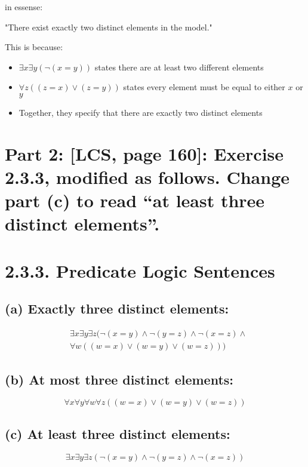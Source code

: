 \documentclass{article}
\begin{document}
\vspace{1em}
in essense:

\vspace{1em}
"There exist exactly two distinct elements in the model."

\vspace{1em}
This is because:
\begin{itemize}
    \item $\exists x \exists y (\neg(x = y))$ states there are at least two different elements
    \item $\forall z ((z = x) \lor (z = y))$ states every element must be equal to either $x$ or $y$
    \item Together, they specify that there are exactly two distinct elements
\end{itemize}

\newpage


\section*{Part 2: [LCS, page 160]: Exercise 2.3.3, modified as follows. Change part (c) to read “at least three
distinct elements”.}
\section*{2.3.3. Predicate Logic Sentences}

\subsection*{(a) Exactly three distinct elements:}
\[\begin{aligned}
& \exists x \exists y \exists z (\neg(x = y) \land \neg(y = z) \land \neg(x = z) \land \\
& \forall w ((w = x) \lor (w = y) \lor (w = z)))
\end{aligned}\]

\subsection*{(b) At most three distinct elements:}
\[\forall x \forall y \forall w \forall z ((w = x) \lor (w = y) \lor (w = z))\]

\subsection*{(c) At least three distinct elements:}
\[\exists x \exists y \exists z (\neg(x = y) \land \neg(y = z) \land \neg(x = z))\]
\end{document}
